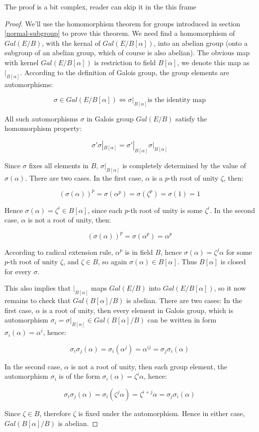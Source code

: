 \documentclass{article}
\begin{document}
\begin{mdframed}
The proof is a bit complex, reader can skip it in the this frame
\begin{proof}
We'll use the homomorphism theorem for groups introduced in section \ref{normal-subgroup} to prove this theorem. We need find a homomorphism of $Gal(E/B)$, with the kernal of $Gal(E/B[\alpha])$, into an abelian group (onto a subgroup of an abelian group, which of course is also abelian). The obvious map with kernel $Gal(E/B[\alpha])$ is restriction to field $B[\alpha]$, we denote this map as $|_{B[\alpha]}$. According to the definition of Galois group, the group elements are automorphisms:

\[
\sigma \in Gal(E/B[\alpha]) \iff \sigma|_{B[\alpha]} \text{is the identity map}
\]

All such automorphisms $\sigma$ in Galois group $Gal(E/B)$ satisfy the homomorphism property:

\[
\sigma'\sigma|_{B[\alpha]} = \sigma'|_{B[\alpha]}\sigma|_{B[\alpha]}
\]

Since $\sigma$ fixes all elements in $B$, $\sigma|_{B[\alpha]}$ is completely determined by the value of $\sigma(\alpha)$. There are two cases. In the first case, $\alpha$ is a $p$-th root of unity $\zeta$, then:

\[
(\sigma(\alpha))^p = \sigma(\alpha^p) = \sigma(\zeta^p) = \sigma(1) = 1
\]

Hence $\sigma(\alpha) = \zeta^i \in B[\alpha]$, since each $p$-th root of unity is some $\zeta^i$. In the second case, $\alpha$ is not a root of unity, then:

\[
(\sigma(\alpha))^p = \sigma(\alpha^p) = \alpha^p
\]

According to radical extension rule, $\alpha^p$ is in field $B$, hence $\sigma(\alpha) = \zeta^j\alpha$ for some $p$-th root of unity $\zeta$, and $\zeta \in B$, so again $\sigma(\alpha) \in B[\alpha]$. Thus $B[\alpha]$ is closed for every $\sigma$.

This also implies that $|_{B[\alpha]}$ maps $Gal(E/B)$ into $Gal(E/B[\alpha])$, so it now remains to check that $Gal(B[\alpha]/B)$ is abelian. There are two cases: In the first case, $\alpha$ is a root of unity, then every element in Galois group, which is automorphism $\sigma_i = \sigma|_{B[\alpha]} \in Gal(B[\alpha]/B)$ can be written in form $\sigma_i(\alpha) = \alpha^i$, hence:

\[
\sigma_i\sigma_j(\alpha) = \sigma_i(\alpha^j) = \alpha^{ij} = \sigma_j\sigma_i(\alpha)
\]

In the second case, $\alpha$ is not a root of unity, then each group element, the automorphism $\sigma_i$ is of the form $\sigma_i(\alpha) = \zeta^i\alpha$, hence:

\[
\sigma_i\sigma_j(\alpha) = \sigma_i(\zeta^j\alpha) = \zeta^{i + j}\alpha = \sigma_j\sigma_i(\alpha)
\]

Since $\zeta \in B$, therefore $\zeta$ is fixed under the automorphism. Hence in either case, $Gal(B[\alpha]/B)$ is abelian.
\end{proof}
\end{mdframed}
\end{document}
